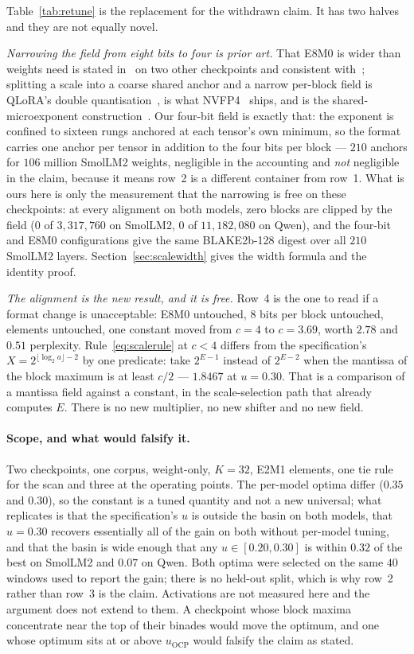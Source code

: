 \documentclass[11pt]{article}
\theoremstyle{definition}
\begin{document}
Table~\ref{tab:retune} is the replacement for the withdrawn claim. It has two
halves and they are not equally novel.

\emph{Narrowing the field from eight bits to four is prior art.} That E8M0 is
wider than weights need is stated in~\cite{chhugani} on two other checkpoints and
consistent with~\cite{mxgap}; splitting a scale into a coarse shared anchor and
a narrow per-block field is QLoRA's double quantisation~\cite{qlora}, is what
NVFP4~\cite{nvfp4} ships, and is the shared-microexponent
construction~\cite{msfp}. Our four-bit field is exactly that: the exponent is
confined to sixteen rungs anchored at each tensor's own minimum, so the format
carries one anchor per tensor in addition to the four bits per block --- $210$
anchors for $106$ million SmolLM2 weights, negligible in the accounting and
\emph{not} negligible in the claim, because it means row~2 is a different container from
row~1. What is ours here is only the measurement that the narrowing is free on
these checkpoints: at every alignment on both models, zero blocks are clipped
by the field ($0$ of $3{,}317{,}760$ on SmolLM2, $0$ of $11{,}182{,}080$ on
Qwen), and the four-bit and E8M0 configurations give the same BLAKE2b-128 digest
over all $210$ SmolLM2 layers. Section~\ref{sec:scalewidth} gives the
width formula and the identity proof.

\emph{The alignment is the new result, and it is free.} Row~4 is the one to
read if a format change is unacceptable: E8M0 untouched, $8$ bits per block
untouched, elements untouched, one constant moved from $c=4$ to $c=3.69$, worth
$2.78$ and $0.51$ perplexity. Rule~\eqref{eq:scalerule} at $c<4$ differs from
the specification's $X = 2^{\lfloor\log_2 a\rfloor-2}$ by one predicate: take
$2^{E-1}$ instead of $2^{E-2}$ when the mantissa of the block maximum is at
least $c/2$ --- $1.8467$ at $u=0.30$. That is a comparison of a mantissa field
against a constant, in the scale-selection path that already computes $E$. There
is no new multiplier, no new shifter and no new field.

\paragraph{Scope, and what would falsify it.} Two checkpoints, one corpus,
weight-only, $K=32$, E2M1 elements, one tie rule for the scan and three at the
operating points. The per-model optima differ ($0.35$ and $0.30$), so the
constant is a tuned quantity and not a new universal; what replicates is that
the specification's $u$ is outside the basin on both models, that $u=0.30$
recovers essentially all of the gain on both without per-model tuning, and that
the basin is wide enough that any $u\in[0.20,0.30]$ is within $0.32$ of the best
on SmolLM2 and $0.07$ on Qwen. Both optima were selected on the same $40$
windows used to report the gain; there is no held-out split, which is why row~2
rather than row~3 is the claim. Activations are not measured here and the
argument does not extend to them. A checkpoint whose block maxima concentrate
near the top of their binades would move the optimum, and one whose optimum sits
at or above $u_{\mathrm{OCP}}$ would falsify the claim as stated.
\end{document}
